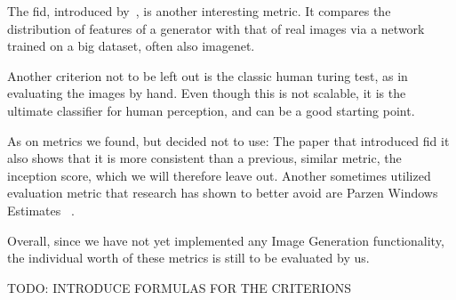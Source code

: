 The \ac{fid}, introduced by~\cite{fid}, is another interesting metric.
It compares the distribution of features of a generator with that of real images via a network trained on a big
dataset, often also imagenet.

Another criterion not to be left out is the classic human turing test, as in evaluating the images by hand.
Even though this is not scalable, it is the ultimate classifier for human perception, and can be a good starting
point.

As on metrics we found, but decided not to use: The paper that introduced \ac{fid} it also shows that it is more
consistent than a previous, similar metric, the inception score, which we will therefore leave out.
Another sometimes utilized evaluation metric that research has shown to better avoid are Parzen Windows Estimates~
\cite{note_on_eval}.

Overall, since we have not yet implemented any Image Generation functionality, the individual worth of these metrics
is still to be evaluated by us.

TODO: INTRODUCE FORMULAS FOR THE CRITERIONS
